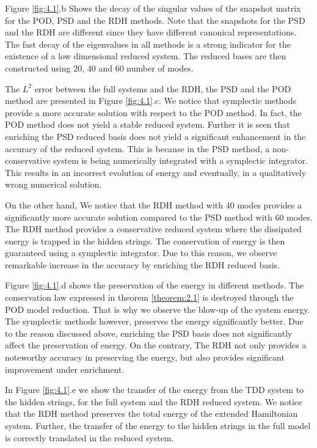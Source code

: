 Figure \ref{fig:4.1}.b Shows the decay of the singular values of the snapshot matrix for the POD, PSD and the RDH methods. Note that the snapshots for the PSD and the RDH are different since they have different canonical representations. The fast decay of the eigenvalues in all methods is a strong indicator for the existence of a low dimensional reduced system. The reduced bases are then constructed using 20, 40 and 60 number of modes.

The $L^2$ error between the full systems and the RDH, the PSD and the POD method are presented in Figure \ref{fig:4.1}.c. We notice that symplectic methods provide a more accurate solution with respect to the POD method. In fact, the POD method does not yield a stable reduced system.  Further it is seen that enriching the PSD reduced basis does not yield a significant enhancement in the accuracy of the reduced system. This is because in the PSD method, a non-conservative system is being numerically integrated with a symplectic integrator. This results in an incorrect evolution of energy and eventually, in a qualitatively wrong numerical solution.

On the other hand, We notice that the RDH method with 40 modes provides a significantly more accurate solution compared to the PSD method with 60 modes. The RDH method provides a conservative reduced system where the dissipated energy is trapped in the hidden strings. The conservation of energy is then guaranteed using a symplectic integrator. Due to this reason, we observe remarkable increase in the accuracy by enriching the RDH reduced basis.

Figure \ref{fig:4.1}.d shows the preservation of the energy in different methods. The conservation law expressed in theorem \ref{theorem:2.1} is destroyed through the POD model reduction. That is why we observe the blow-up of the system energy. The symplectic methods however, preserves the energy significantly better. Due to the reason discussed above, enriching the PSD basis does not significantly affect the preservation of energy. On the contrary, The RDH not only provides a noteworthy accuracy in preserving the energy, but also provides significant improvement under enrichment.

In Figure \ref{fig:4.1}.e we show the transfer of the energy from the TDD system to the hidden strings, for the full system and the RDH reduced system. We notice that the RDH method preserves the total energy of the extended Hamiltonian system. Further, the transfer of the energy to the hidden strings in the full model is correctly translated in the reduced system.

